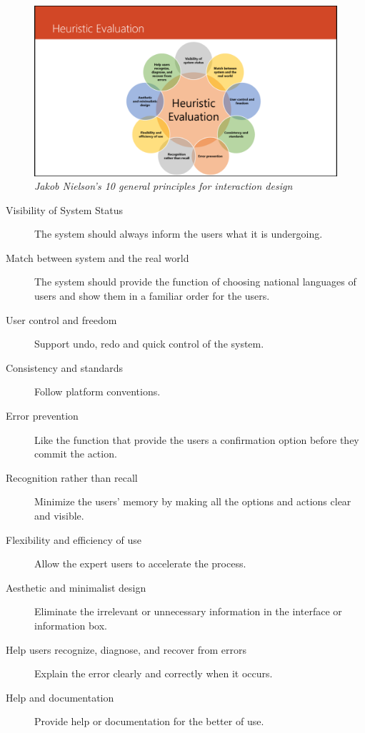 \documentclass[twocolumn]{article}
\begin{document}
\begin{figure}
  \centering
  \includegraphics[width=\columnwidth, clip=true, trim=380 5 300 160]{fig/heuristic-evaluation.png}
  \caption{\emph{Jakob Nielson's 10 general principles for interaction design}}
  \label{fig:heuristic-evaluation}
\end{figure}

\begin{description}
  \item[Visibility of System Status]
    The system should always inform the users what it is undergoing.
  \item[Match between system and the real world]
    The system should provide the function of choosing national languages of users and show them in a familiar order for the users.
  \item[User control and freedom]
    Support undo, redo and quick control of the system.
  \item[Consistency and standards]
    Follow platform conventions.
  \item[Error prevention]
    Like the function that provide the users a confirmation option before they commit the action.
  \item[Recognition rather than recall]
    Minimize the users’ memory by making all the options and actions clear and visible.
  \item[Flexibility and efficiency of use]
    Allow the expert users to accelerate the process.
  \item[Aesthetic and minimalist design]
    Eliminate the irrelevant or unnecessary information in the interface or information box.
  \item[Help users recognize, diagnose, and recover from errors]
    Explain the error clearly and correctly when it occurs.
  \item[Help and documentation]
    Provide help or documentation for the better of use.
\end{description}
\end{document}
